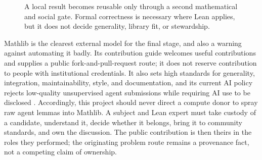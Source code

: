 \documentclass[10pt]{article}
\begin{document}
\begin{figure}[H]
\centering
{}
\caption{A local result becomes reusable only through a second mathematical
and social gate.  Formal correctness is necessary where Lean applies, but it
does not decide generality, library fit, or stewardship.}
\label{fig:local-to-general}
\end{figure}

Mathlib is the clearest external model for the final stage, and also a warning
against automating it badly.  Its contribution guide welcomes useful
contributions and supplies a public fork-and-pull-request route; it does not
reserve contribution to people with institutional credentials.  It also sets
high standards for generality, integration, maintainability, style, and
documentation, and its current AI policy rejects low-quality unsupervised
agent submissions while requiring AI use to be disclosed \cite{mathlib}.
Accordingly, this project should never direct a compute donor to spray raw
agent lemmas into Mathlib.  A subject and Lean expert must take custody of a
candidate, understand it, decide whether it belongs, bring it to community
standards, and own the discussion.  The public contribution is then theirs in
the roles they performed; the originating problem route remains a provenance
fact, not a competing claim of ownership.
\end{document}

